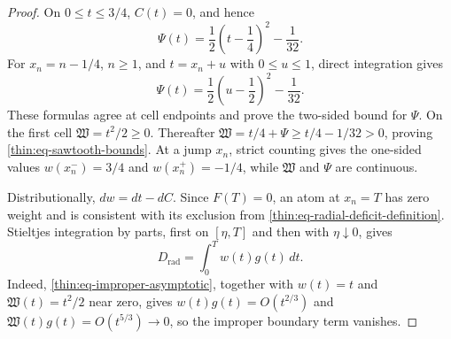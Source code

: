 \documentclass[11pt]{article}
\numberwithin{equation}{section}
\theoremstyle{definition}
\theoremstyle{remark}
\begin{document}
\begin{proof}
On \(0\leq t\leq3/4\), \(C(t)=0\), and hence
\begin{equation}
  \Psi(t)=\frac12\left(t-\frac14\right)^2-\frac1{32}.
  \label{thin:eq-first-sawtooth-cell}
\end{equation}
For \(x_n=n-1/4\), \(n\geq1\), and \(t=x_n+u\) with
\(0\leq u\leq1\), direct integration gives
\begin{equation}
  \Psi(t)=\frac12\left(u-\frac12\right)^2-\frac1{32}.
  \label{thin:eq-periodic-sawtooth-cell}
\end{equation}
These formulas agree at cell endpoints and prove the two-sided bound for
\(\Psi\).  On the first cell \(\mathfrak W=t^2/2\geq0\).  Thereafter
\(\mathfrak W=t/4+\Psi\geq t/4-1/32>0\), proving
\eqref{thin:eq-sawtooth-bounds}.  At a jump \(x_n\), strict counting gives
the one-sided values \(w(x_n^-)=3/4\) and \(w(x_n^+)=-1/4\), while
\(\mathfrak W\)
and \(\Psi\) are continuous.

Distributionally, \(dw=dt-dC\).  Since \(F(T)=0\), an atom at \(x_n=T\)
has zero weight and is consistent with its exclusion from
\eqref{thin:eq-radial-deficit-definition}.  Stieltjes integration by parts,
first on \([\eta,T]\) and then with \(\eta\downarrow0\), gives
\begin{equation}
  D_{\mathrm{rad}}=\int_0^T w(t)g(t)\,dt.
  \label{thin:eq-stieltjes-start}
\end{equation}
Indeed, \eqref{thin:eq-improper-asymptotic}, together with
\(w(t)=t\) and \(\mathfrak W(t)=t^2/2\) near zero, gives
\(w(t)g(t)=O(t^{2/3})\) and
\(\mathfrak W(t)g(t)=O(t^{5/3})\to0\), so the improper
boundary term vanishes.


\end{proof}
\end{document}
